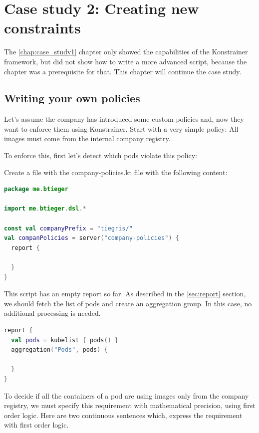 \chapter{Case study 2: Creating new constraints}
\label{chap:case_study2}

The \ref{chap:case_study1} chapter only showed the capabilities of the Konstrainer framework, but did not show how to write a more advanced script, because the  chapter was a prerequisite for that. This chapter will continue the case study.

\section{Writing your own policies}

Let's assume the company has introduced some custom policies and, now they want to enforce them using Konstrainer. Start with a very simple policy: All images must come from the internal company registry.

To enforce this, first let's detect which pods violate this policy:

Create a file with the company-policies.kt file with the following content:

\begin{lstlisting}[caption={Report skeleton},language=Kotlin,label=code:todo]
package me.btieger

import me.btieger.dsl.*

const val companyPrefix = "tiegris/"
val companPolicies = server("company-policies") {
  report {

  }
}
\end{lstlisting}

This script has an empty report so far. As described in the \ref{sec:report} section, we should fetch the list of pods and create an aggregation group. In this case, no additional processing is needed.

\begin{lstlisting}[caption={Aggregation group},language=Kotlin,label=code:todo]
report {
  val pods = kubelist { pods() }
  aggregation("Pods", pods) {

  }
}
\end{lstlisting}

To decide if all the containers of a pod are using images only from the company registry, we must specify this requirement with mathematical precision, using first order logic. Here are two continuous sentences which, express the requirement with first order logic.

